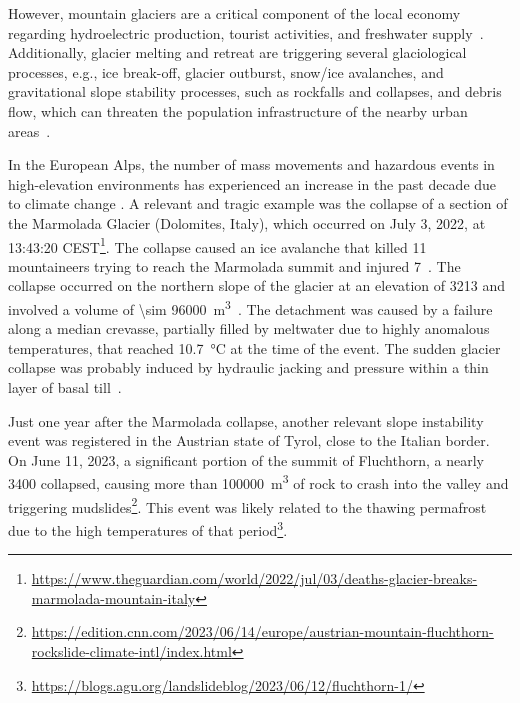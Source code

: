 However, mountain glaciers are a critical component of the local economy regarding hydroelectric production, tourist activities, and freshwater supply~\citep{Barnett2005, hock2005}. 
Additionally, glacier melting and retreat are triggering several glaciological processes, e.g., ice break-off, glacier outburst, snow/ice avalanches, and gravitational slope stability processes, such as rockfalls and collapses, and debris flow, which can threaten the population infrastructure of the nearby urban areas~\citep{Kaab2004, Deline2015, Giordan2020}.

In the European Alps, the number of mass movements and hazardous events in high-elevation environments has experienced an increase in the past decade due to climate change \citep{chiarle2023, Nigrelli2024}.
A relevant and tragic example was the collapse of a section of the Marmolada Glacier (Dolomites, Italy), which occurred on July 3, 2022, at 13:43:20 CEST\footnote{\url{https://www.theguardian.com/world/2022/jul/03/deaths-glacier-breaks-marmolada-mountain-italy}}. 
The collapse caused an ice avalanche that killed 11 mountaineers trying to reach the Marmolada summit and injured 7~\citep{Olivieri2023, Bondesan2023}.
The collapse occurred on the northern slope of the glacier at an elevation of \SI{3213}{\masl} and involved a volume of \SI{\sim 96000}{\cubic\meter}~\citep{Olivieri2023}.
The detachment was caused by a failure along a median crevasse, partially filled by meltwater due to highly anomalous temperatures, that reached \SI{10.7}{\celsius} at the time of the event.
The sudden glacier collapse was probably induced by hydraulic jacking and pressure within a thin layer of basal till~\citep{Bondesan2023}.

Just one year after the Marmolada collapse, another relevant slope instability event was registered in the Austrian state of Tyrol, close to the Italian border. 
On June 11, 2023, a significant portion of the summit of Fluchthorn, a nearly \SI{3400}{\masl} collapsed, causing more than \SI{100000}{\cubic\meter} of rock to crash into the valley and triggering mudslides\footnote{\mbox{\url{https://edition.cnn.com/2023/06/14/europe/austrian-mountain-fluchthorn-rockslide-climate-intl/index.html}}}.
This event was likely related to the thawing permafrost due to the high temperatures of that period\footnote{\url{https://blogs.agu.org/landslideblog/2023/06/12/fluchthorn-1/}}.

